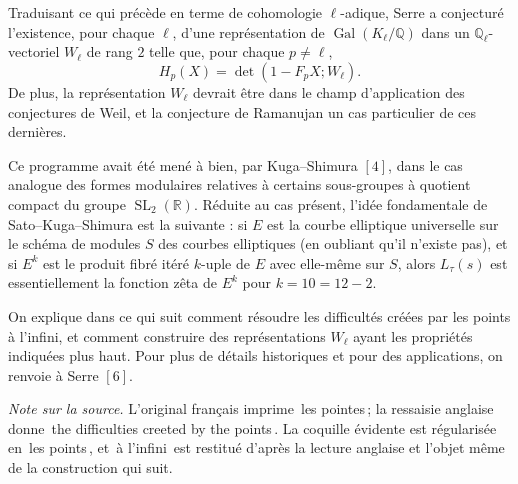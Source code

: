 \documentclass[10pt]{article}
\newcommand{\Q}{\mathbb Q}
\newcommand{\R}{\mathbb R}
\newcommand{\SL}{\operatorname{SL}}
\newcommand{\Gal}{\operatorname{Gal}}
\newcommand{\frquote}[1]{\guillemotleft{}\,#1\,\guillemotright{}}
\begin{document}
Traduisant ce qui précède en terme de cohomologie $\ell$-adique, Serre a conjecturé
l'existence, pour chaque $\ell$, d'une représentation de $\Gal(K_\ell/\Q)$ dans un
$\Q_\ell$-vectoriel $W_\ell$ de rang $2$ telle que, pour chaque $p\ne\ell$,
\[
H_p(X)=\det(1-F_pX;W_\ell).
\]
De plus, la représentation $W_\ell$ devrait être dans le champ d'application des
conjectures de Weil, et la conjecture de Ramanujan un cas particulier de ces dernières.

Ce programme avait été mené à bien, par Kuga--Shimura \([4]\), dans le cas analogue des
formes modulaires relatives à certains sous-groupes à quotient compact du groupe
$\SL_2(\R)$.
Réduite au cas présent, l'idée fondamentale de Sato--Kuga--Shimura est la suivante :
si $E$ est la courbe elliptique universelle sur le schéma de modules $S$ des courbes
elliptiques (en oubliant qu'il n'existe pas), et si $E^k$ est le produit fibré itéré
$k$-uple de $E$ avec elle-même sur $S$, alors $L_\tau(s)$ est essentiellement la fonction zêta
de $E^k$ pour
$k=10=12-2$.

On explique dans ce qui suit comment résoudre les difficultés créées par les points à
l'infini, et comment construire des représentations $W_\ell$ ayant les propriétés indiquées
plus haut. Pour plus de détails historiques et pour des applications, on renvoie à Serre
\([6]\).

\noindent\emph{Note sur la source.} L'original français imprime \frquote{les pointes};
la ressaisie anglaise donne \frquote{the difficulties creeted by the points}. La coquille
évidente est régularisée en \frquote{les points}, et \frquote{à l'infini} est restitué
d'après la lecture anglaise et l'objet même de la construction qui suit.
\end{document}
